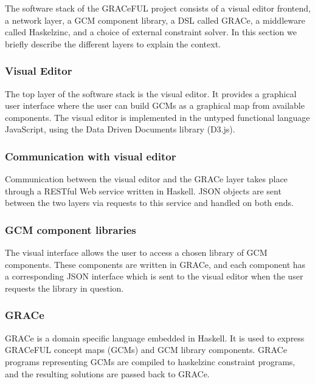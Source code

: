 The software stack of the GRACeFUL project consists of
%
a visual editor frontend,
%
a network layer,
%
a GCM component library,
%
a DSL called GRACe,
%
a middleware called Haskelzinc, and
%
a choice of external constraint solver.
%
In this section we briefly describe the different layers to explain
the context.

\subsubsection{Visual Editor}

The top layer of the software stack is the visual editor.
%
It provides a graphical user interface where the user can build GCMs
as a graphical map from available components.
%
The visual editor is implemented in the untyped functional language
JavaScript, using the Data Driven Documents library (D3.js).
%

\subsubsection{Communication with visual editor}

Communication between the visual editor and the GRACe layer takes
place through a RESTful Web service written in Haskell.
%
JSON objects are sent between the two layers via requests to this
service and handled on both ends.

\subsubsection{GCM component libraries}

The visual interface allows the user to access a chosen library of GCM
components.
%
These components are written in GRACe, and each component has a
corresponding JSON interface which is sent to the visual editor when
the user requests the library in question.

\subsubsection{GRACe}

GRACe is a domain specific language embedded in Haskell.
%
It is used to express GRACeFUL concept maps (GCMs) and GCM library
components.
%
GRACe programs representing GCMs are compiled to haskelzinc constraint
programs, and the resulting solutions are passed back to GRACe.

